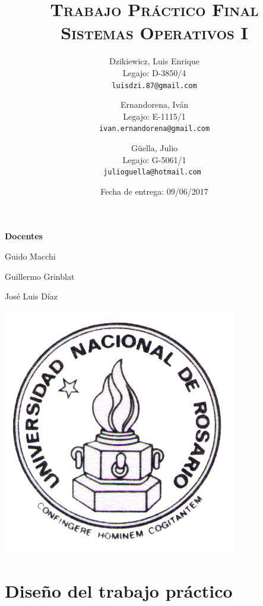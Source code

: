 \documentclass[a4paper]{article}
\author{
        Dzikiewicz, Luis Enrique\\
        Legajo: D-3850/4\\
        \texttt{luisdzi.87@gmail.com}
        \and Ernandorena, Iván\\
        Legajo: E-1115/1\\
        \texttt{ivan.ernandorena@gmail.com}
        \and Güella, Julio\\
        Legajo: G-5061/1\\
        \texttt{julioguella@hotmail.com }
}
\date{
    Fecha de entrega: 09/06/2017
}
\title {
    \Huge  \textsc{Trabajo Práctico Final\\}
    \large \textsc{Sistemas Operativos I}
}
\begin{document}

    \maketitle

    \thispagestyle{empty}

    \begin{center}
         \large \bf Docentes
    \end{center}

    \begin{center}
      Guido Macchi
      
      Guillermo Grinblat

      José Luis Díaz
        \vspace{2cm}

        \includegraphics[scale=1.5]{Logo-Unr}
    

    \end{center}


\newpage




\section*{Diseño del trabajo práctico}
\end{document}
